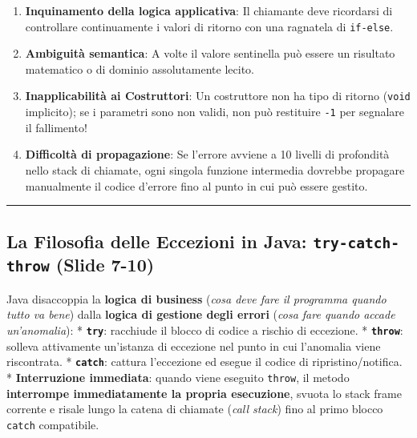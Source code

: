 \documentclass[11pt,a4paper,oneside]{report}
\newcommand{\passthrough}[1]{#1}
\providecommand{\tightlist}{\setlength{\itemsep}{0pt}\setlength{\parskip}{0pt}}
\begin{document}
\begin{enumerate}
\def\labelenumi{\arabic{enumi}.}
\tightlist
\item
  \textbf{Inquinamento della logica applicativa}: Il chiamante deve
  ricordarsi di controllare continuamente i valori di ritorno con una
  ragnatela di \passthrough{\lstinline!if-else!}.
\item
  \textbf{Ambiguità semantica}: A volte il valore sentinella può essere
  un risultato matematico o di dominio assolutamente lecito.
\item
  \textbf{Inapplicabilità ai Costruttori}: Un costruttore non ha tipo di
  ritorno (\passthrough{\lstinline!void!} implicito); se i parametri
  sono non validi, non può restituire \passthrough{\lstinline!-1!} per
  segnalare il fallimento!
\item
  \textbf{Difficoltà di propagazione}: Se l'errore avviene a 10 livelli
  di profondità nello stack di chiamate, ogni singola funzione
  intermedia dovrebbe propagare manualmente il codice d'errore fino al
  punto in cui può essere gestito.
\end{enumerate}

\begin{center}\rule{0.5\linewidth}{0.5pt}\end{center}

\subsection{\texorpdfstring{La Filosofia delle Eccezioni in Java:
\texttt{try-catch-throw} (Slide
7-10)}{La Filosofia delle Eccezioni in Java: try-catch-throw (Slide 7-10)}}\label{chap16_la-filosofia-delle-eccezioni-in-java-try-catch-throw-slide-7-10}

Java disaccoppia la \textbf{logica di business} (\emph{cosa deve fare il
programma quando tutto va bene}) dalla \textbf{logica di gestione degli
errori} (\emph{cosa fare quando accade un'anomalia}): *
\textbf{\passthrough{\lstinline!try!}}: racchiude il blocco di codice a
rischio di eccezione. * \textbf{\passthrough{\lstinline!throw!}}:
solleva attivamente un'istanza di eccezione nel punto in cui l'anomalia
viene riscontrata. * \textbf{\passthrough{\lstinline!catch!}}: cattura
l'eccezione ed esegue il codice di ripristino/notifica. *
\textbf{Interruzione immediata}: quando viene eseguito
\passthrough{\lstinline!throw!}, il metodo \textbf{interrompe
immediatamente la propria esecuzione}, svuota lo stack frame corrente e
risale lungo la catena di chiamate (\emph{call stack}) fino al primo
blocco \passthrough{\lstinline!catch!} compatibile.
\end{document}
